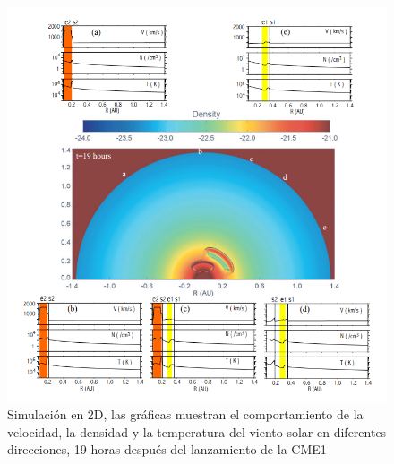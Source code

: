\begin{figure}[H]
    \centering
    \includegraphics[width=0.8\linewidth]{imag/2D1.png}
    \caption[Simulación en 2D de dos CMEs hecha por \cite{gonzalez-esparza-2004}]{Simulación en 2D, las gráficas muestran el comportamiento de la velocidad, la densidad y la temperatura del viento solar en diferentes direcciones, 19 horas después del lanzamiento de la CME1}
    \label{fig:simulación 2D1}
\end{figure}

